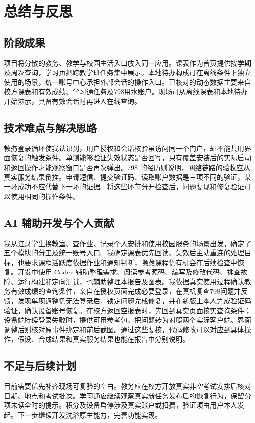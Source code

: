 \section{总结与反思}

\subsection{阶段成果}
项目将分散的教务、教学与校园生活入口放入同一应用。课表作为首页提供按学期及周次查询，学习页把跨教学班任务集中展示。本地待办构成可在离线条件下独立使用的场景，统一账号中心承担外部会话的操作入口。已核对的动态数据主要来自校方课表和有效成绩、学习通任务及798用水账户。现场可从离线课表和本地待办开始演示，具备有效会话时再进入在线查询。

\subsection{技术难点与解决思路}
教务登录循环使我认识到，用户授权和会话核验虽访问同一个门户，却不能共用界面恢复的触发条件。单测能够验证失效状态是否回写，只有覆盖安装后的实际启动和返回操作才能观察窗口是否再次弹出。798 的经历则说明，网络链路的验收应从真实服务结果倒推。申请短信、提交验证码、读取账户数据是三项不同的验证，某一环成功不应代替下一环的证据。将这些环节分开检查后，问题复现和修复验证可以使用相同的操作条件。

\subsection{AI 辅助开发与个人贡献}
我从江财学生换教室、查作业、记录个人安排和使用校园服务的场景出发，确定了五个模块的分工及统一账号入口。我确定课表优先回读、失效后主动重连的处理目标，也要求课程活跃度依据作业和通知判断，隐藏课程仍有机会在后续检查中恢复。开发中使用 Codex 辅助整理需求、阅读参考源码、编写及修改代码、排查故障、运行构建和定向测试，也辅助整理本报告及图表。我依据真实使用过程确认教务有效成绩的查询条件，亲自在授权页面完成必要登录，在真机复查798问题并反馈，发现单项调整仍无法登录后，锁定问题完成修复，并在新版上本人完成验证码验证，确认设备账号恢复。在校方返回空报表时，先回到真实页面核实查询条件；设备端持续登录失败时，提供可用参考包，把问题转为对照两个实际客户端。界面调整后则核对原事件绑定和前后截图。通过这些复核，代码修改可以对应到具体操作，假设、合成结果和真实服务结果也能在报告中分别说明。

\subsection{不足与后续计划}
目前需要优先补齐现场可复验的空白。教务应在校方开放真实非空考试安排后核对日期、地点和考试批次。学习通应继续观察真实新任务发布后的恢复行为，保留分项未读全时的提示。积分及设备启停涉及真实账户或扣费，验证须由用户本人发起。下一步继续开发洗浴原生能力，完善功能实现。
